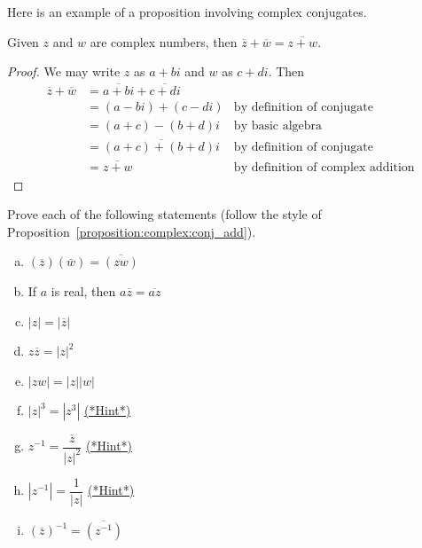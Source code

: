 Here is an example of a proposition involving complex conjugates.

\begin{prop}\label{proposition:complex:conj_add} Given $z$ and $w$ are complex numbers, then $\overline{z} + \overline{w} = \overline{z + w}$.
\end{prop}
\begin{proof}
We may write $z$ as $a + bi$ and $w$ as $c + di$. Then
\begin{align*}
\overline{z} + \overline{w} &= \overline{a + bi} + \overline{c + di} \\
& = (a - bi) + (c - di) & \textrm{by~definition~of~conjugate}\\
& = (a + c) - (b + d)i & \textrm{by~basic algebra}\\
& = \overline{(a + c) + (b + d)i} & \textrm{by~definition~of~conjugate}\\
& = \overline{z + w} & \textrm{by~definition~of~complex~addition}
\end{align*}
\end{proof}

\begin{exercise}\label{exercise:complex:cxprops}
Prove each of the following statements (follow the style of Proposition~\ref{proposition:complex:conj_add}).
\begin{multicols}{2}
\begin{enumerate}[(a)]
\item 
$(\overline{z}) (\overline{w}) = \overline{(zw)}$
\item
If $a$ is real, then $a \overline{z} = \overline{az}$
\item
$|z| = | \overline{z}|$
\item
$z \overline{z} = |z|^2$
 \item
$|z w| = |z|  |w|$
\item
$|z|^3 = |z^3|$ 
\hyperref[sec:complex:hints]{(*Hint*)}
\item
$z^{-1} = \dfrac{\overline{z}}{|z|^2}$ 
\hyperref[sec:complex:hints]{(*Hint*)}

\item
$|z^{-1}| = \dfrac{1}{|z|}$
\hyperref[sec:complex:hints]{(*Hint*)}

\item
$(\overline{z})^{-1} = \overline {\left( z^{-1} \right )}$
\end{enumerate}
\end{multicols}
\end{exercise}

